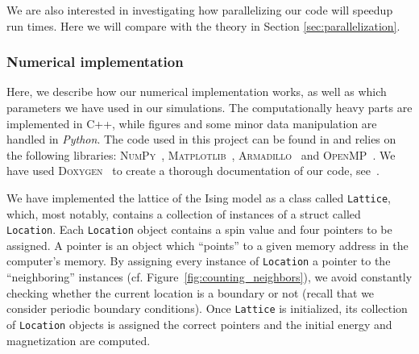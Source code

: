 \documentclass[english,notitlepage,reprint]{revtex4-2}  %
\begin{document}
We are also interested in investigating how parallelizing our code will speedup run times.
Here we will compare with the theory in Section \ref{sec:parallelization}.

\subsubsection{Numerical implementation}
Here, we describe how our numerical implementation works, as well as which parameters we have used in our simulations.
The computationally heavy parts are implemented in C++, while figures and some minor data manipulation are handled in \textit{Python}.
The code used in this project can be found in \cite{FYS4150Project4} and relies on the following libraries: \textsc{NumPy}~\cite{numpy}, \textsc{Matplotlib}~\cite{matplotlib}, \textsc{Armadillo}~\cite{armadillo} and \textsc{OpenMP}~\cite{openmp}. 
We have used \textsc{Doxygen}~\cite{doxygen} to create a thorough documentation of our code, see~\cite{FYS4150Project4_doc}. 

We have implemented the lattice of the Ising model as a class called \texttt{Lattice}, which, most notably, contains a collection of instances of a struct called \texttt{Location}. 
Each \texttt{Location} object contains a spin value and four pointers to be assigned.
A pointer is an object which ``points'' to a given memory address in the computer's memory.
By assigning every instance of \texttt{Location} a pointer to the ``neighboring'' instances (cf. Figure~\ref{fig:counting_neighbors}), we avoid constantly checking whether the current location is a boundary or not (recall that we consider periodic boundary conditions).
Once \texttt{Lattice} is initialized, its collection of \texttt{Location} objects is assigned the correct pointers and the initial energy and magnetization are computed.
\end{document}
